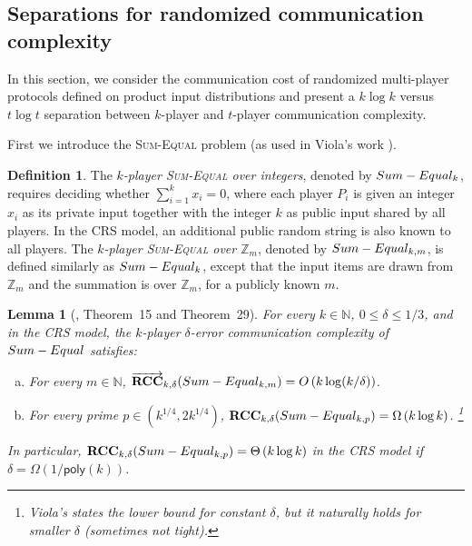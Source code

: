 \documentclass[11pt]{article}
\numberwithin{equation}{section}
\newtheorem{lemma}[theorem]{Lemma}
\theoremstyle{definition}
\newtheorem{definition}[theorem]{Definition}
\theoremstyle{plain}
\newcommand{\Z}{\mathbb Z}
\newcommand{\N}{\mathbb N}
\newcommand{\poly}{\mathsf{poly}}
\newcommand{\error}{\ensuremath{\delta}}
\newcommand{\bigo}[1]{\ensuremath{{{O} \left( {#1} \right)}}}
\newcommand{\bigomega}[1]{\ensuremath{{\Omega \left( {#1} \right)}}}
\newcommand{\bigtheta}[1]{\ensuremath{{\Theta\left({#1} \right)}}}
\newcommand{\rcc}{\ensuremath{\mathbf{RCC}}}
\newcommand{\rccone}{\ensuremath{\overrightarrow{\mathbf{RCC}}}}
\newcommand{\sumequal}{\textsc{Sum-Equal} }
\begin{document}
\subsection{Separations for randomized communication complexity}

In this section, we consider the communication cost of randomized multi-player protocols defined on product input distributions and present a $k\log k$ versus $t\log t$ separation between $k$-player and $t$-player communication complexity.

First we introduce the \sumequal problem (as used in Viola's work \cite{Viola:2013we}).

\begin{definition}
The \emph{$k$-player \sumequal over integers}, denoted by $\sumequal_k$, 
requires deciding whether $\sum_{i =1 }^{k} x_i = 0$,
where each player $P_i$ is given an integer $x_i$ as its private input together with the integer $k$ as public input shared by all players.
In the CRS model, an additional public random string is also known to all players.
%
The \emph{$k$-player \sumequal over $\Z_m$}, denoted by $\sumequal_{k,m}$, 
is defined similarly 
as $\sumequal_{k}$,
except that the input items are drawn from $\Z_m$ and the summation is over $\Z_m$,
for a publicly known $m$.
\end{definition}

\begin{lemma}[\cite{Viola:2013we}, Theorem~15 and Theorem~29]
\label{lemma:Viola}
For every $k\in\N$, $0\le \error\le 1/3$, 
and in the CRS model, 
the $k$-player $\error$-error communication complexity of $\sumequal$ satisfies:

\begin{enumerate}[(a)]
    
\item For every $m\in \N$, $\rccone_{k,\error}(\sumequal_{k,m}) = \bigo{k\log (k/\error)}$.

\item For every prime $p\in(k^{1/4},2k^{1/4})$, $\rcc_{k,\error}(\sumequal_{k,p}) = \bigomega{k\log k}$.%
\footnote{Viola's states the lower bound for constant $\error$, but it naturally holds for smaller $\error$ (sometimes not tight).}
\end{enumerate}

In particular, $\rcc_{k,\error}(\sumequal_{k,p})=\bigtheta{k\log k}$ in the CRS model if $\error=\bigomega{1/\poly(k)}$.
\end{lemma}
\end{document}
